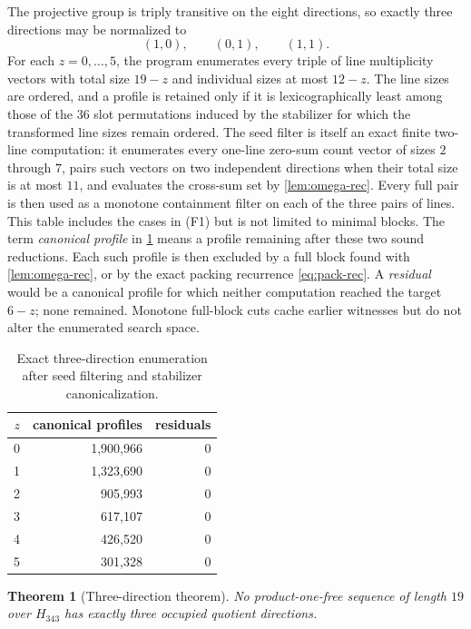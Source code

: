 \documentclass[11pt]{amsart}
\newtheorem{theorem}{Theorem}[section]
\theoremstyle{definition}
\newcommand{\HH}{H_{343}}
\begin{document}
The projective group is triply transitive on the eight directions, so exactly three directions may be normalized to
\[
(1,0),\qquad (0,1),\qquad (1,1).
\]
For each $z=0,\ldots,5$, the program enumerates every triple of line
multiplicity vectors with total size $19-z$ and individual sizes at
most $12-z$.  The line sizes are ordered, and a profile is retained only
if it is lexicographically least among those of the $36$ slot
permutations induced by the stabilizer for which the transformed line
sizes remain ordered.  The seed filter is itself an exact finite
two-line computation: it enumerates every one-line zero-sum count
vector of sizes $2$ through $7$, pairs such vectors on two independent
directions when their total size is at most $11$, and evaluates the
cross-sum set by \cref{lem:omega-rec}.  Every full pair is then used as
a monotone containment filter on each of the three pairs of lines.
This table includes the cases in (F1) but is not limited to minimal
blocks.
The term \emph{canonical profile} in \cref{tab:three} means a profile
remaining after these two sound reductions.  Each such profile is then
excluded by a full block found with \cref{lem:omega-rec}, or by the
exact packing recurrence \eqref{eq:pack-rec}.  A \emph{residual} would
be a canonical profile for which neither computation reached the target
$6-z$; none remained.  Monotone full-block cuts cache earlier witnesses
but do not alter the enumerated search space.

\begin{table}[ht]
\centering
\caption{Exact three-direction enumeration after seed filtering and stabilizer canonicalization.}
\label{tab:three}
\begin{tabular}{@{}rrr@{}}
\toprule
$z$ & canonical profiles & residuals\\
\midrule
0 & 1,900,966 & 0\\
1 & 1,323,690 & 0\\
2 &   905,993 & 0\\
3 &   617,107 & 0\\
4 &   426,520 & 0\\
5 &   301,328 & 0\\
\bottomrule
\end{tabular}
\end{table}

\begin{theorem}[Three-direction theorem]\label{thm:three}
No product-one-free sequence of length $19$ over $\HH$ has exactly three occupied quotient directions.
\end{theorem}
\end{document}
